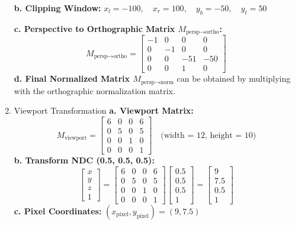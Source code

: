 \documentclass{article}
\begin{document}
\begin{enumerate}
        \textbf{b. Clipping Window:} $x_l = -100,\quad x_r = 100,\quad y_b = -50,\quad y_t = 50$

        \textbf{c. Perspective to Orthographic Matrix $M_{\text{persp}\to\text{ortho}}$:}
        \[
        M_{\text{persp}\to\text{ortho}} =
        \begin{bmatrix}
        -1 & 0 & 0 & 0 \\
        0 & -1 & 0 & 0 \\
        0 & 0 & -51 & -50 \\
        0 & 0 & 1 & 0
        \end{bmatrix}
        \]
        \textbf{d. Final Normalized Matrix $M_{\text{persp}\to\text{norm}}$} can be obtained by multiplying with the orthographic normalization matrix.

    \item Viewport Transformation
        \medbreak
        \textbf{a. Viewport Matrix:}
        \[
        M_{\text{viewport}} =
        \begin{bmatrix}
        6 & 0 & 0 & 6 \\
        0 & 5 & 0 & 5 \\
        0 & 0 & 1 & 0 \\
        0 & 0 & 0 & 1
        \end{bmatrix}
        \quad \text{(width = 12, height = 10)}
        \]
        \textbf{b. Transform NDC (0.5, 0.5, 0.5):}
        \[
        \begin{bmatrix}
        x \\
        y \\
        z \\
        1
        \end{bmatrix}
        =
        \begin{bmatrix}
        6 & 0 & 0 & 6 \\
        0 & 5 & 0 & 5 \\
        0 & 0 & 1 & 0 \\
        0 & 0 & 0 & 1
        \end{bmatrix}
        \begin{bmatrix}
        0.5 \\
        0.5 \\
        0.5 \\
        1
        \end{bmatrix}
        =
        \begin{bmatrix}
        9 \\
        7.5 \\
        0.5 \\
        1
        \end{bmatrix}
        \]
        \textbf{c. Pixel Coordinates:} $(x_{\text{pixel}}, y_{\text{pixel}}) = (9, 7.5)$


\end{enumerate}
\end{document}
